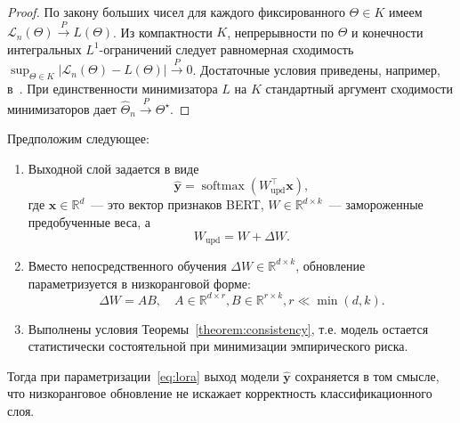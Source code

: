\begin{proof}
По закону больших чисел для каждого фиксированного $\Theta\in K$ имеем $\mathscr{L}_n(\Theta)\xrightarrow{P}L(\Theta)$.
Из компактности $K$, непрерывности по $\Theta$ и конечности интегральных $L^1$-ограничений следует равномерная сходимость $\sup_{\Theta\in K}\bigl|\mathscr{L}_n(\Theta)-L(\Theta)\bigr|\xrightarrow{P}0$. Достаточные условия приведены, например, в~\cite{vapnik1974StatTheory}.
При единственности минимизатора $L$ на $K$ стандартный аргумент сходимости минимизаторов дает $\widehat{\Theta}_n\xrightarrow{P}\Theta^\star$.
\end{proof}

\begin{theorem}
\label{theorem:lowrank}
Предположим следующее:
\begin{enumerate}
    \item Выходной слой задается в виде
    \begin{equation}
    \label{eq:softmax}
        \hat{\mathbf{y}} = \operatorname{softmax}\!\left(W_{\mathrm{upd}}^{\top} \mathbf{x}\right),
    \end{equation}
    где $\mathbf{x} \in \mathbb{R}^d$~--- это вектор признаков BERT, $W \in \mathbb{R}^{d \times k}$~--- замороженные предобученные веса, а
    \begin{equation}
    \label{eq:update}
        W_{\mathrm{upd}} = W + \Delta W.
    \end{equation}

    \item Вместо непосредственного обучения $\Delta W \in \mathbb{R}^{d \times k}$, обновление параметризуется в низкоранговой форме:
    \begin{equation}
    \label{eq:lora}
        \Delta W = A B,
        \quad A \in \mathbb{R}^{d \times r},
        B \in \mathbb{R}^{r \times k},
        r \ll \min(d,k).
    \end{equation}

    \item Выполнены условия Теоремы~\ref{theorem:consistency}, т.е. модель остается статистически состоятельной при минимизации эмпирического риска.
\end{enumerate}

Тогда при параметризации~\eqref{eq:lora} выход модели $\hat{\mathbf{y}}$ сохраняется в том смысле, что низкоранговое обновление не искажает корректность классификационного слоя.
\end{theorem}
